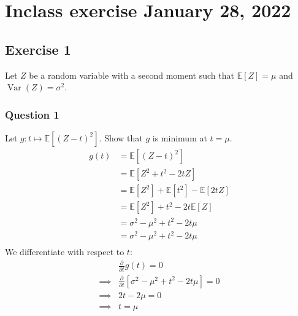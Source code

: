 \documentclass{article}
\newcommand{\1}{\mathbf{1}}
\newcommand{\E}{\mathbb{E}}
\newcommand{\var}{\operatorname{Var}}
\begin{document}
\section{Inclass exercise January 28, 2022}
\subsection{Exercise 1}
Let \(Z\) be a random variable with a second moment such that \(\E[Z] = \mu\) and \(\var(Z) = \sigma^2\).
\subsubsection{Question 1}
Let \(g : t \mapsto \E[(Z-t)^2]\). Show that \(g\) is minimum at \(t = \mu\).
\begin{align*}
  g(t)
   & =
  \E\left[ (Z-t)^2 \right]                                       \\
   & =
  \E\left[ Z^2 + t^2 - 2tZ \right]                               \\
   & =
  \E\left[ Z^2\right] + \E\left[t^2\right] - \E\left[2tZ \right] \\
   & =
  \E\left[ Z^2\right] + t^2 - 2t\E\left[Z \right]                \\
   & =
  \sigma^2 - \mu^2 + t^2 - 2t\mu                                 \\
   & =
  \sigma^2 - \mu^2 + t^2 - 2t\mu                                 \\
\end{align*}
We differentiate with respect to \(t\):
\begin{align*}
           & \frac{\partial}{\partial t} g(t) = 0                             \\
  \implies &
  \frac{\partial}{\partial t} \left[\sigma^2 - \mu^2 + t^2 - 2t\mu\right] = 0 \\
  \implies &
  2t - 2\mu  = 0                                                              \\
  \implies &
  t = \mu                                                                     \\
\end{align*}
\end{document}
